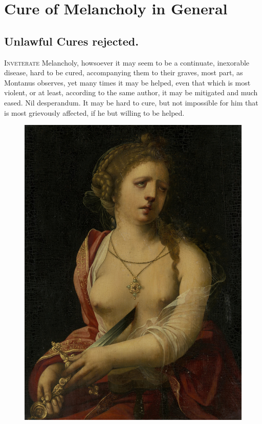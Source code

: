 \chapter{Cure of Melancholy in General}
{
\section{Unlawful Cures rejected.}
\lettrine[lines=3]{I}{nveterate} Melancholy, howsoever it may seem to be a continuate,
inexorable disease, hard to be cured, accompanying them to their
graves, most part, as Montanus observes, yet many times it may be
helped, even that which is most violent, or at least, according to the
same author, it may be mitigated and much eased. Nil desperandum.
It may be hard to cure, but not impossible for him that is most
grievously affected, if he but willing to be helped.

\begin{figure}[p]
  \centering
  \includegraphics[keepaspectratio,width=\textwidth]{figures/suicide-of-lucretia-small.jpg}
  \caption{}
  \label{fig:suicideoflucretia}
\end{figure}

}
